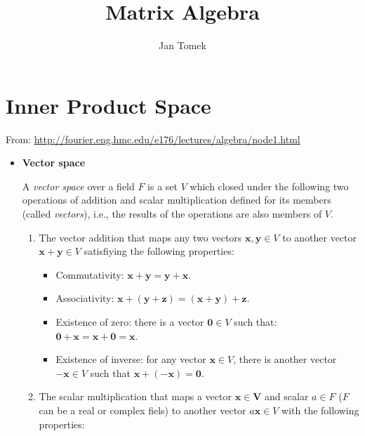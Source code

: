 \documentclass[10pt,b5paper,titlepage]{book}
\author{Jan Tomek}
\title{\bf Matrix Algebra}
\begin{document}
\maketitle

\tableofcontents

\chapter{Inner Product Space}

From: \url{http://fourier.eng.hmc.edu/e176/lectures/algebra/node1.html}

\begin{itemize}
    \item \textbf{Vector space}

        A \textit{vector space} over a field $F$ is a set $V$ which closed under
        the following two operations of addition and scalar multiplication
        defined for its members (called \textit{vectors}), i.e., the results
        of the operations are also members of $V$.

        \begin{enumerate}
            \item The vector addition that maps any two vectors
                $\mathbf{x}, \mathbf{y} \in V$ to another vector
                $\mathbf{x} + \mathbf{y} \in V$ satisfiying the following
                properties:
                \begin{itemize}
                    \item Commutativity: $\mathbf{x} + \mathbf{y} = \mathbf{y} + \mathbf{x}$.
                    \item Associativity: $\mathbf{x} + (\mathbf{y} + \mathbf{z}) = (\mathbf{x} + \mathbf{y}) + \mathbf{z}$.
                    \item Existence of zero: there is a vector $\mathbf{0} \in V$ such that: $\mathbf{0} + \mathbf{x} = \mathbf{x} + \mathbf{0} = \mathbf{x}$.
                    \item Existence of inverse: for any vector $\mathbf{x} \in V$,
                        there is another vector $-\mathbf{x} \in V$ such that $\mathbf{x} + (- \mathbf{x}) = \mathbf{0}$.
                \end{itemize}
            \item The scalar multiplication that maps a vector $\mathbf{x \in V}$
                and scalar $a \in F$ ($F$ can be a real or complex fiels) to another
                vector $a \mathbf{x} \in V$ with the following properties:


\end{enumerate}
\end{itemize}
\end{document}

